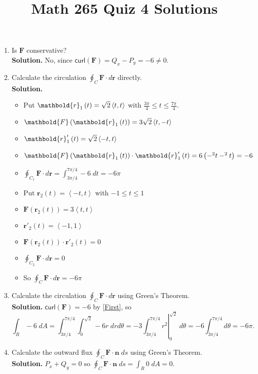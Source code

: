 \documentclass[12pt]{article}
\title{Math 265 Quiz 4 Solutions}\author{}\date{}
\let\cos\relax\DeclareMathOperator{\cos}{\mathsf{cos}}
\let\sin\relax\DeclareMathOperator{\sin}{\mathsf{sin}}
\begin{document}
\maketitle
\thispagestyle{empty}
\begin{enumerate}
\item\label{First} Is $\mathbold{F}$ conservative?\\
{\bf Solution.}
No, since $\mathsf{curl}\left(\mathbold{F}\right)
=Q_x-P_y=-6\ne 0$.
\item Calculate the circulation $\oint_C\mathbold{F}
\cdot d\mathbold{r}$ directly.\\
{\bf Solution.}
\begin{itemize}
\item Put $\mathbold{r}_1\left(t\right)=\sqrt{2}
\left\langle \cos{t},\sin{t}\right\rangle$
with $\frac{3\pi}{4}
\le t\le\frac{7\pi}{4}$.
\item $\mathbold{F}\left(\mathbold{r}_1\left(t\right)\right)
=3\sqrt{2}
\left\langle \sin{t},-\cos{t}\right\rangle$
\item $\mathbold{r}'_1\left(t\right)
=\sqrt{2}\left\langle -\sin{t},\cos{t}\right\rangle$
\item $\mathbold{F}\left(\mathbold{r}_1\left(t\right)\right)
\cdot\mathbold{r}'_1\left(t\right)
=6\left(-\sin^2{t}-\cos^2{t}\right)=-6$
\item $\oint_{C_1}\mathbold{F} \cdot d\mathbold{r}
=\int_{3\pi/4}^{7\pi/4}-6\;dt=-6\pi$
\item Put $\mathbold{r}_2\left(t\right)=
\left\langle -t,t\right\rangle$ with $-1\le t\le 1$
\item $\mathbold{F}\left(\mathbold{r}_2\left(t\right)\right)
=3\left\langle t,t\right\rangle$
\item $\mathbold{r}'_2\left(t\right)
=\left\langle -1,1\right\rangle$
\item $\mathbold{F}\left(\mathbold{r}_2\left(t\right)\right)
\cdot\mathbold{r}'_2\left(t\right)=0$
\item $\oint_{C_2}\mathbold{F} \cdot d\mathbold{r}=0$
\item So $\oint_C\mathbold{F} \cdot d\mathbold{r}=-6\pi$
\end{itemize}
\item Calculate the circulation $\oint_C\mathbold{F}
\cdot d\mathbold{r}$ using Green's Theorem.\\
{\bf Solution.}
$\mathsf{curl}\left(\mathbold{F}\right)=-6$ by
\autoref{First}, so
\[\int_R-6\;dA=\int_{3\pi/4}^{7\pi/4}\int_0^{\sqrt{2}}-6r
\;drd\theta
=-3\left.\int_{3\pi/4}^{7\pi/4}r^2\right|_0^{\sqrt{2}}\;d\theta
=-6\int_{3\pi/4}^{7\pi/4}d\theta=-6\pi.\]

\item Calculate the outward flux $\oint_C\mathbold{F}
\cdot\mathbold{n}\;ds$ using Green's Theorem.\\
{\bf Solution.}
$P_x+Q_y=0$ so
$\oint_C\mathbold{F}
\cdot\mathbold{n}\;ds=\int_R0\;dA=0$.
\end{enumerate}
\end{document}
